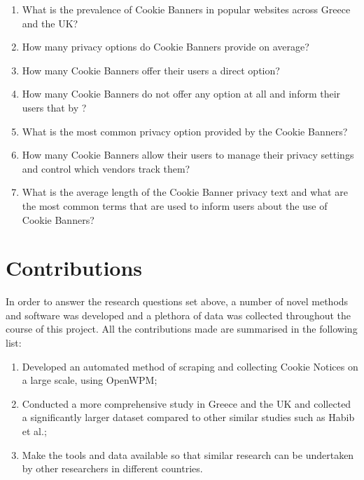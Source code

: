 \documentclass[../main.tex]{subfiles}
\begin{document}
\begin{enumerate}[label=\textbf{RQ\arabic*}:, ref=RQ\arabic*, leftmargin=1.65cm]
    \item \label{rq:prevalence} What is the prevalence of Cookie Banners in popular websites across Greece and the UK? 
    \item \label{rq:options_avg} How many privacy options do Cookie Banners provide on average?
    \item \label{rq:direct_opt_out} How many Cookie Banners offer their users a direct  option?
    \item \label{rq:no_options} How many Cookie Banners do not offer any option at all and inform their users that by ?
    \item \label{rq:common_ctas} What is the most common privacy option provided by the Cookie Banners? 
    \item \label{rq:manage_options_count} How many Cookie Banners allow their users to manage their privacy settings and control which vendors track them?
    \item \label{rq:common_privacy_txt} What is the average length of the Cookie Banner privacy text and what are the most common terms that are used to inform users about the use of Cookie Banners?
\end{enumerate}
    
\section{Contributions}

In order to answer the research questions set above, a number of novel methods and software was developed and a plethora of data was collected throughout the course of this project. All the contributions made are summarised in the following list:

\begin{enumerate}
    \item \label{contr_1} Developed an automated method of scraping and collecting Cookie Notices on a large scale, using OpenWPM;
    \item \label{contr_2} Conducted a more comprehensive study in Greece and the UK and collected a significantly larger dataset compared to other similar studies such as Habib et al.;
    \item \label{contr_3} Make the tools and data available so that similar research can be undertaken by other researchers in different countries.
\end{enumerate}
\end{document}

